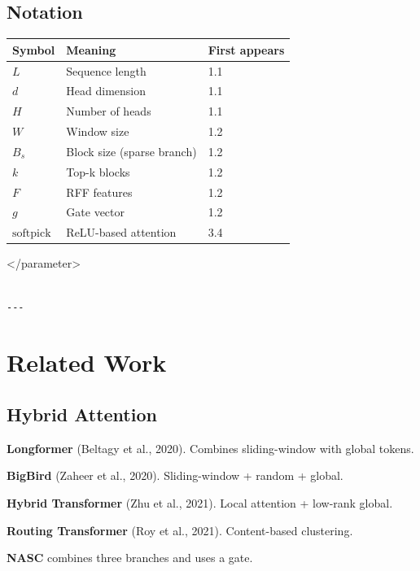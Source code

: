 \subsection{Notation}

\begin{table}[H]
\centering
\small
\begin{tabular}{lll}
\toprule
\textbf{Symbol} & \textbf{Meaning} & \textbf{First appears} \\
\midrule
$L$ & Sequence length & 1.1 \\
$d$ & Head dimension & 1.1 \\
$H$ & Number of heads & 1.1 \\
$W$ & Window size & 1.2 \\
$B_s$ & Block size (sparse branch) & 1.2 \\
$k$ & Top-k blocks & 1.2 \\
$F$ & RFF features & 1.2 \\
$g$ & Gate vector & 1.2 \\
$\text{softpick}$ & ReLU-based attention & 3.4 \\
\bottomrule
\end{tabular}
\end{table}
\textless{}/parameter\textgreater{}
\begin{lstlisting}

---
\end{lstlisting}


\section{Related Work}

\subsection{Hybrid Attention}

\textbf{Longformer} (Beltagy et al., 2020). Combines sliding-window with global 
tokens.

\textbf{BigBird} (Zaheer et al., 2020). Sliding-window + random + global.

\textbf{Hybrid Transformer} (Zhu et al., 2021). Local attention + low-rank 
global.

\textbf{Routing Transformer} (Roy et al., 2021). Content-based clustering.

\textbf{NASC} combines three branches and uses a gate.

